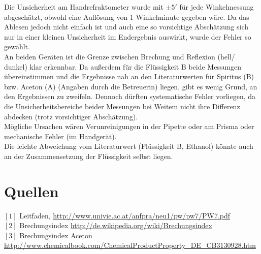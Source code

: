 \documentclass[12pt,a4paper]{article}
\begin{document}
\begin{multicols}{2}
Die Unsicherheit am Handrefraktometer wurde mit $\pm 5'$ für jede Winkelmessung abgeschätzt, obwohl eine Auflösung von 1 Winkelminute gegeben wäre. Da das Ablesen jedoch nicht einfach ist und auch eine so vorsichtige Abschätzung sich nur in einer kleinen Unsicherheit im Endergebnis auswirkt, wurde der Fehler so gewählt.\\

An beiden Geräten ist die Grenze zwischen Brechung und Reflexion (hell/ dunkel) klar erkennbar. Da außerdem für die Flüssigkeit B beide Messungen übereinstimmen und die Ergebnisse nah an den Literaturwerten für Spiritus (B) bzw. Aceton (A) (Angaben durch die Betreuerin) liegen, gibt es wenig Grund, an den Ergebnissen zu zweifeln.
Dennoch dürften systematische Fehler vorliegen, da die Unsicherheitsbereiche beider Messungen bei Weitem nicht ihre Differenz abdecken (trotz vorsichtiger Abschätzung).\\
Mögliche Ursachen wären Verunreinigungen in der Pipette oder am Prisma oder mechanische Fehler (im Handgerät).\\
Die leichte Abweichung vom Literaturwert (Flüssigkeit B, Ethanol) könnte auch an der Zusammensetzung der Flüssigkeit selbst liegen.


\section{Quellen}
$[1]$ Leitfaden, \url{http://www.univie.ac.at/anfpra/neu1/pw/pw7/PW7.pdf}\\
$[2]$ Brechungsindex \url{http://de.wikipedia.org/wiki/Brechungsindex}\\
$[3]$ Brechungsindex Aceton \url{http://www.chemicalbook.com/ChemicalProductProperty_DE_CB3130928.htm}

\end{multicols}
\end{document}
